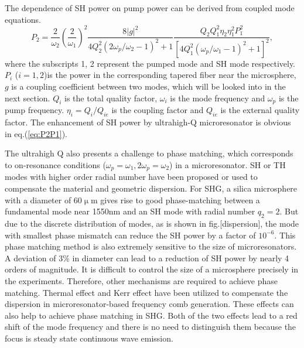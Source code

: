 \documentclass[a4paper,12pt,hyperref]{article}
\begin{document}
The dependence of SH power on pump power can be derived from coupled mode equations\cite{haus1991coupled}.
\begin{equation}
P_2 = \frac{2}{\omega_2}(\frac{2}{\omega_1})^2\frac{8|g|^2}{4Q_2^2(2\omega_p/\omega_2-1)^2+1}\frac{Q_2Q_1^2\eta_2\eta_1^2P_1^2}{[4Q_1^2(\omega_p/\omega_1-1)^2+1]^2},
\label{eq:P2P1}
\end{equation}
where the subscripts 1, 2 represent the pumped mode and SH mode respectively. $P_i$ ($i=1, 2$)is the power in the corresponding tapered fiber near the microsphere, $g$ is a coupling coefficient between two modes, which will be looked into in the next section. $Q_i$ is the total quality factor, $\omega_i$ is the mode frequency and $\omega_p$ is the pump frequency. $\eta_{i}=Q_i/Q_{ie}$ is the coupling factor and $Q_{ie}$ is the external quality factor. The enhancement of SH power by ultrahigh-Q microresonator is obvious in eq.(\ref{eq:P2P1}). 

The ultrahigh Q also presents a challenge to phase matching, which corresponds to on-resonance conditions ($\omega_p = \omega_1, 2\omega_p = \omega_2$) in a microresonator\cite{carmon2007visible, kozyreff2008whispering, xu2008second, farnesi2014optical}. SH or TH modes with higher order radial number have been proposed or used to compensate the material and geometric dispersion\cite{carmon2007visible, kozyreff2008whispering, farnesi2014optical}. For SHG, a silica microsphere with a diameter of 60$\upmu$m gives rise to good phase-matching between a fundamental mode near 1550nm and an SH mode with radial number $q_2=2$. But due to the discrete distribution of modes, as is shown in fig.[dispersion], the mode with smallest phase mismatch can reduce the SH power by a factor of $10^{-6}$. This phase matching method is also extremely sensitive to the size of microresonators. A deviation of 3\% in diameter can lead to a reduction of SH power by nearly 4 orders of magnitude. It is difficult to control the size of a microsphere precisely in the experiments. Therefore, other mechanisms are required to achieve phase matching. Thermal effect and Kerr effect have been utilized to compensate the dispersion in microresonator-based frequency comb generation\cite{del2011octave, herr2014temporal}. These effects can also help to achieve phase matching in SHG. Both of the two effects lead to a red shift of the mode frequency \cite{ilchenko1992thermal, treussart1998evidence,  carmon2004dynamical, fomin2005nonstationary} and there is no need to distinguish them because the focus is steady state continuous wave emission. 
\end{document}
